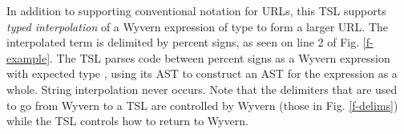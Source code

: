 In addition to supporting conventional notation for URLs, this TSL supports \emph{typed interpolation}
of a Wyvern expression of type  to form a larger URL. The interpolated term is delimited by percent signs,
as seen on line 2 of Fig. \ref{f-example}. The TSL parses code between percent signs  as a Wyvern expression with expected type , using its AST to construct an AST for the expression as a whole. String interpolation 
never occurs. Note that the delimiters that are used to go from Wyvern to a TSL are controlled by Wyvern (those in Fig. \ref{f-delims}) while the TSL controls how to return to Wyvern.

